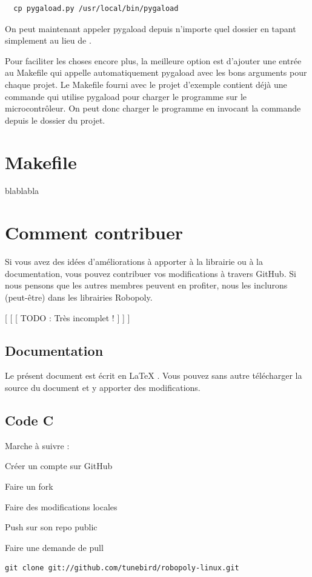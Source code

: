 \begin{lstlisting}
  cp pygaload.py /usr/local/bin/pygaload
\end{lstlisting}

On peut maintenant appeler pygaload depuis n'importe quel dossier en tapant
simplement  au lieu de .

Pour faciliter les choses encore plus, la meilleure option est d'ajouter une
entrée au Makefile qui appelle automatiquement pygaload avec les bons arguments
pour chaque projet. Le Makefile fourni avec le projet d'exemple contient déjà
une commande  qui utilise pygaload pour charger le programme sur le
microcontrôleur. On peut donc charger le programme en invocant la commande
 depuis le dossier du projet.

\section{Makefile}
blablabla

\section{Comment contribuer}
Si vous avez des idées d'améliorations à apporter à la librairie ou à la
documentation, vous pouvez contribuer vos modifications à travers GitHub. Si
nous pensons que les autres membres peuvent en profiter, nous les inclurons
(peut-être) dans les librairies Robopoly.

[ [ [ TODO : Très incomplet ! ] ] ] 

\subsection{Documentation}
Le présent document est écrit en \LaTeX{} . Vous pouvez sans autre télécharger la
source du document et y apporter des modifications.

\subsection{Code C}

Marche à suivre :
\begin{list}{}{}
  \item Créer un compte sur GitHub
  \item Faire un fork
  \item Faire des modifications locales
  \item Push sur son repo public
  \item Faire une demande de pull
\end{list}

\begin{lstlisting}[style=console]
  git clone git://github.com/tunebird/robopoly-linux.git
\end{lstlisting}


